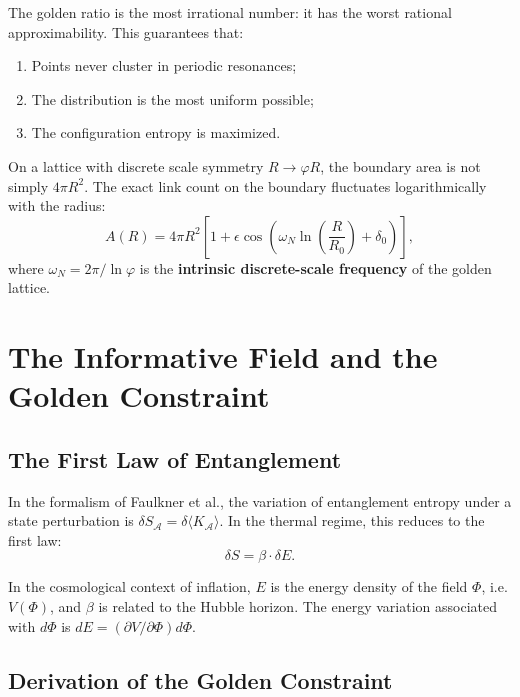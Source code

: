 \documentclass[11pt,a4paper]{article}
\theoremstyle{definition}
\begin{document}
The golden ratio is the most irrational number: it has the worst rational approximability. This guarantees that:
\begin{enumerate}
    \item Points never cluster in periodic resonances;
    \item The distribution is the most uniform possible;
    \item The configuration entropy is maximized.
\end{enumerate}

On a lattice with discrete scale symmetry $R \to \varphi R$, the boundary area is not simply $4\pi R^2$. The exact link count on the boundary fluctuates logarithmically with the radius:
\begin{equation}\label{eq:modulated_area}
A(R) = 4\pi R^2 \left[ 1 + \epsilon \cos\left( \omega_N \ln\left(\frac{R}{R_0}\right) + \delta_0 \right) \right],
\end{equation}
where $\omega_N = 2\pi/\ln\varphi$ is the \textbf{intrinsic discrete-scale frequency} of the golden lattice.

\section{The Informative Field and the Golden Constraint}\label{sec:constraint}

\subsection{The First Law of Entanglement}

In the formalism of Faulkner et al., the variation of entanglement entropy under a state perturbation is $\delta S_{\mathcal{A}} = \delta \langle K_{\mathcal{A}} \rangle$. In the thermal regime, this reduces to the first law:
\begin{equation}
\delta S = \beta \cdot \delta E.
\end{equation}

In the cosmological context of inflation, $E$ is the energy density of the field $\Phi$, i.e. $V(\Phi)$, and $\beta$ is related to the Hubble horizon. The energy variation associated with $d\Phi$ is $dE = (\partial V/\partial\Phi) d\Phi$.

\subsection{Derivation of the Golden Constraint}
\end{document}
